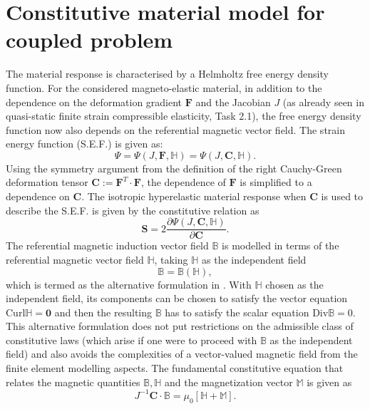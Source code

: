 \documentclass[11pt,a4paper,final]{article}
\begin{document}
\section{Constitutive material model for coupled problem}
The material response is characterised by a Helmholtz free energy density function. For the considered magneto-elastic material, in addition to the dependence on the deformation gradient $\mathbf{F}$ and the Jacobian $J$ (as already seen in quasi-static finite strain compressible elasticity, Task 2.1), the free energy density function now also depends on the referential magnetic vector field. The strain energy function (S.E.F.) is given as: 
\begin{equation}
\Psi = \Psi (J, \mathbf{F}, \mathbb{H}) = \Psi (J, \mathbf{C}, \mathbb{H}).
\label{eq:3.1}
\end{equation}
Using the symmetry argument from the definition of the right Cauchy-Green deformation tensor $\mathbf{C} := \mathbf{F}^T \cdot \mathbf{F}$, the dependence of $\mathbf{F}$ is simplified to a dependence on $\mathbf{C}$. The isotropic hyperelastic material response when $\mathbf{C}$ is used to describe the S.E.F. is given by the constitutive relation as
\begin{equation}
\mathbf{S} = 2 \dfrac{\partial \Psi (J, \mathbf{C}, \mathbb{H})}{\partial \mathbf{C}}.
\label{eq:3.2}
\end{equation}
The referential magnetic induction vector field $\mathbb{B}$ is modelled in terms of the referential magnetic vector field $\mathbb{H}$, taking $\mathbb{H}$ as the independent field
\begin{equation}
\mathbb{B} = \mathbb{B}(\mathbb{H}),
\label{eq:3.3}
\end{equation}
which is termed as the alternative formulation in \cite{dorfmann2004}. With $\mathbb{H}$ chosen as the independent field, its components can be chosen to satisfy the vector equation $\text{Curl} \mathbb{H} = \mathbf{0}$ and then the resulting $\mathbb{B}$ has to satisfy the scalar equation $\text{Div} \mathbb{B} = 0$. This alternative formulation does not put restrictions on the admissible class of constitutive laws (which arise if one were to proceed with $\mathbb{B}$ as the independent field) and also avoids the complexities of a vector-valued magnetic field from the finite element modelling aspects. The fundamental constitutive equation that relates the magnetic quantities $\mathbb{B}, \mathbb{H}$ and the magnetization vector $\mathbb{M}$ is given as \cite{dorfmann2004,dorfmann2005}
\begin{equation}
J^{-1} \mathbf{C} \cdot \mathbb{B} = \mu_0 \left[ \mathbb{H} + \mathbb{M} \right].
\label{eq:3.3.2}
\end{equation}
\end{document}

